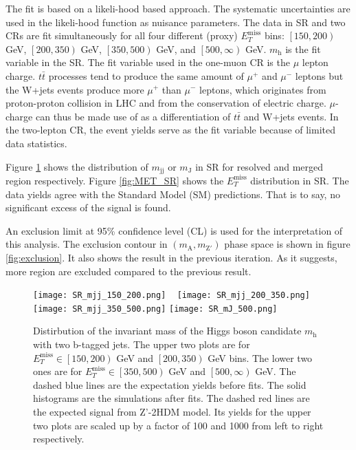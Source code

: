 \documentclass[class=NCU_thesis, crop=false]{standalone}
\begin{document}
	The fit is based on a likeli-hood based approach. The systematic uncertainties are used in the likeli-hood function as nuisance parameters. The data in SR and two CRs are fit simultaneously for all four different (proxy) $E_T^{\mathrm{miss}}$ bins: $\left[150, 200\right)$ GeV, $\left[200, 350\right)$ GeV, $\left[350, 500\right)$ GeV, and $\left[500, \infty \right)$ GeV. $m_{\mathrm{h}}$ is the fit variable in the SR. The fit variable used in the one-muon CR is the $\mu$ lepton charge. $t\bar{t}$ processes tend to produce the same amount of $\mu^+$ and $\mu^-$ leptons but the W+jets events produce more $\mu^+$ than $\mu^-$ leptons, which originates from proton-proton collision in LHC and from the conservation of electric charge. $\mu$-charge can thus be made use of as a differentiation of $t\bar{t}$ and W+jets events. In the two-lepton CR, the event yields serve as the fit variable because of limited data statistics.
	
	Figure \ref{fig:SR_mj} shows the distribution of $m_{\mathrm{jj}}$ or $m_{\mathrm{J}}$ in SR for resolved and merged region respectively. Figure \ref{fig:MET_SR} shows the $E_T^{\mathrm{miss}}$ distribution in SR. The data yields agree with the Standard Model (SM) predictions. That is to say, no significant excess of the signal is found.
	
	An exclusion limit at 95\% confidence level (CL) is used for the interpretation of this analysis. The exclusion contour in $(m_{\mathrm{A}}, m_{\mathrm{Z'}})$ phase space is shown in figure \ref{fig:exclusion}. It also shows the result in the previous iteration. As it suggests, more region are excluded compared to the previous result.
	
	\begin{figure}[!hbt]
		\centering
		\subcaptionbox
		{\label{fig:subfig_SR_mjj_150_200}}
		{\texttt{[image: SR\_mjj\_150\_200.png]}}
		~
		\subcaptionbox
		{\label{fig:subfig_SR_mjj_200_350}}
		{\texttt{[image: SR\_mjj\_200\_350.png]}}
		\vspace{\baselineskip} %
		\subcaptionbox
		{\label{fig:subfig_SR_mjj_350_500}}
		{\texttt{[image: SR\_mjj\_350\_500.png]}}
		\subcaptionbox
		{\label{fig:subfig_SR_mJ_500}}
		{\texttt{[image: SR\_mJ\_500.png]}}
		\caption{Distirbution of the invariant mass of the Higgs boson candidate $m_{\mathrm{h}}$ with two b-tagged jets. The upper two plots are for $E_T^{\mathrm{miss}} \in \left[150, 200\right)$ GeV and $\left[200, 350\right)$ GeV bins. The lower two ones are for $E_T^{\mathrm{miss}} \in \left[350, 500\right)$ GeV and $\left[500, \infty \right)$ GeV. The dashed blue lines are the expectation yields before fits. The solid histograms are the simulations after fits. The dashed red lines are the expected signal from Z'-2HDM model. Its yields for the upper two plots are scaled up by a factor of 100 and 1000 from left to right respectively.}
		\label{fig:SR_mj}
	\end{figure}
\end{document}
